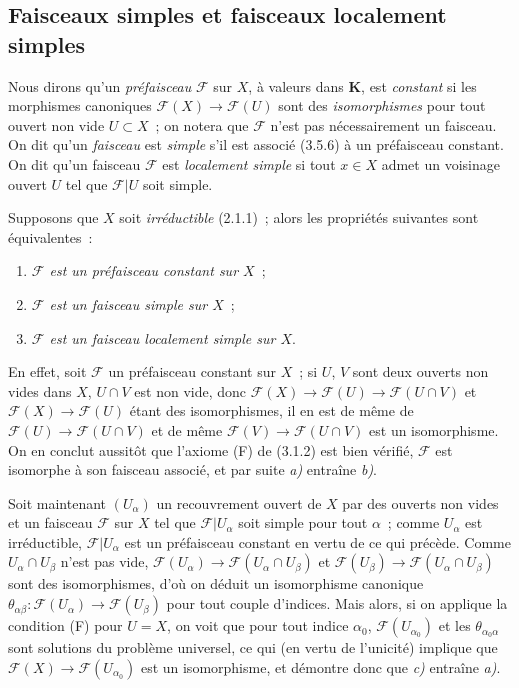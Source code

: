 \subsection{Faisceaux simples et faisceaux localement simples}

\begin{env}[3.6.1]
\label{0.3.6.1-fr}
Nous dirons qu'un \emph{préfaisceau} $\mathcal{F}$ sur $X$, à valeurs dans
$\boldsymbol{K}$, est \emph{constant} si les morphismes canoniques
$\mathcal{F}(X)\to\mathcal{F}(U)$ sont des \emph{isomorphismes} pour tout
ouvert non vide $U\subset X$~; on notera que $\mathcal{F}$ n'est pas
nécessairement un faisceau. On dit qu'un \emph{faisceau} est \emph{simple}
s'il est associé (3.5.6) à un préfaisceau constant. On dit qu'un faisceau
$\mathcal{F}$ est \emph{localement simple} si tout $x\in X$ admet un voisinage
ouvert $U$ tel que $\mathcal{F}|U$ soit simple.
\end{env}

\begin{env}[3.6.2]
\label{0.3.6.2-fr}
Supposons que $X$ soit \emph{irréductible} (2.1.1)~; alors les propriétés
suivantes sont équivalentes~:
\begin{enumerate}
  \item[a)] \emph{$\mathcal{F}$ est un préfaisceau constant sur $X$}~;
  \item[b)] \emph{$\mathcal{F}$ est un faisceau simple sur $X$}~;
  \item[c)] \emph{$\mathcal{F}$ est un faisceau localement simple sur $X$}.
\end{enumerate}

En effet, soit $\mathcal{F}$ un préfaisceau constant sur $X$~; si $U$, $V$
sont deux ouverts non vides dans $X$, $U\cap V$ est non vide, donc
$\mathcal{F}(X)\to\mathcal{F}(U)\to\mathcal{F}(U\cap V)$ et
$\mathcal{F}(X)\to\mathcal{F}(U)$ étant des isomorphismes, il en est de même
de $\mathcal{F}(U)\to\mathcal{F}(U\cap V)$ et de même
$\mathcal{F}(V)\to\mathcal{F}(U\cap V)$ est un isomorphisme. On en conclut
aussitôt que l'axiome (F) de (3.1.2) est bien vérifié, $\mathcal{F}$ est
isomorphe à son faisceau associé, et par suite \emph{a)} entraîne \emph{b)}.

Soit maintenant $(U_\alpha)$ un recouvrement ouvert de $X$ par des ouverts
non vides et un faisceau $\mathcal{F}$ sur $X$ tel que
$\mathcal{F}|U_\alpha$ soit simple pour tout $\alpha$~; comme $U_\alpha$ est
irréductible, $\mathcal{F}|U_\alpha$ est un préfaisceau constant en vertu de
ce qui précède. Comme $U_\alpha\cap U_\beta$ n'est pas vide,
$\mathcal{F}(U_\alpha)\to\mathcal{F}(U_\alpha\cap U_\beta)$ et
$\mathcal{F}(U_\beta)\to\mathcal{F}(U_\alpha\cap U_\beta)$ sont des
isomorphismes, d'où on déduit un isomorphisme canonique
$\theta_{\alpha\beta}:\mathcal{F}(U_\alpha)\to\mathcal{F}(U_\beta)$ pour tout
couple d'indices. Mais alors, si on applique la condition (F) pour $U=X$, on
voit que pour tout indice $\alpha_0$, $\mathcal{F}(U_{\alpha_0})$ et les
$\theta_{\alpha_0\alpha}$ sont solutions du problème universel, ce qui (en
vertu de l'unicité) implique que
$\mathcal{F}(X)\to\mathcal{F}(U_{\alpha_0})$ est un isomorphisme, et démontre
donc que \emph{c)} entraîne \emph{a)}.
\end{env}

